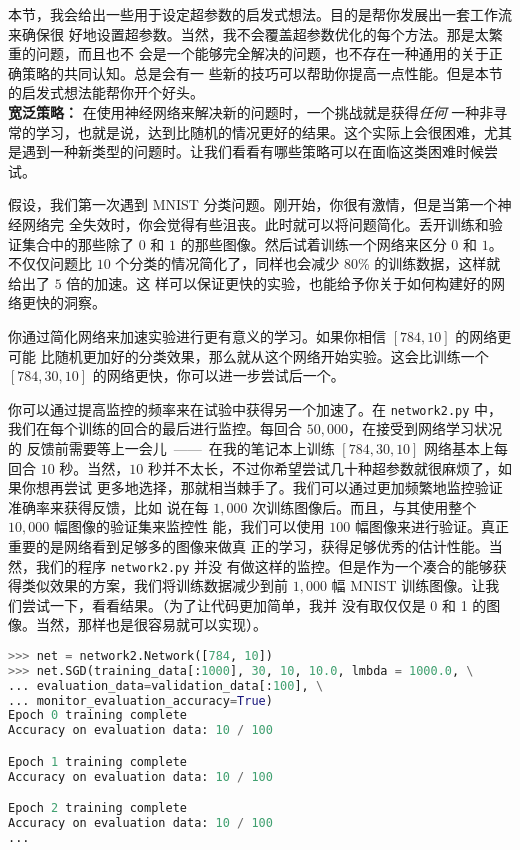 本节，我会给出一些用于设定超参数的启发式想法。目的是帮你发展出一套工作流来确保很
好地设置超参数。当然，我不会覆盖超参数优化的每个方法。那是太繁重的问题，而且也不
会是一个能够完全解决的问题，也不存在一种通用的关于正确策略的共同认知。总是会有一
些新的技巧可以帮助你提高一点性能。但是本节的启发式想法能帮你开个好头。\\

\textbf{宽泛策略：} 在使用神经网络来解决新的问题时，一个挑战就是获得\emph{任何}
一种非寻常的学习，也就是说，达到比随机的情况更好的结果。这个实际上会很困难，尤其
是遇到一种新类型的问题时。让我们看看有哪些策略可以在面临这类困难时候尝试。

假设，我们第一次遇到 MNIST 分类问题。刚开始，你很有激情，但是当第一个神经网络完
全失效时，你会觉得有些沮丧。此时就可以将问题简化。丢开训练和验证集合中的那些除了
$0$ 和 $1$ 的那些图像。然后试着训练一个网络来区分 $0$ 和 $1$。不仅仅问题比 $10$
个分类的情况简化了，同样也会减少 80\% 的训练数据，这样就给出了 $5$ 倍的加速。这
样可以保证更快的实验，也能给予你关于如何构建好的网络更快的洞察。

你通过简化网络来加速实验进行更有意义的学习。如果你相信 $[784, 10]$ 的网络更可能
比随机更加好的分类效果，那么就从这个网络开始实验。这会比训练一个 $[784, 30 ,10]$
的网络更快，你可以进一步尝试后一个。

你可以通过提高监控的频率来在试验中获得另一个加速了。在 \lstinline!network2.py!
中，我们在每个训练的回合的最后进行监控。每回合 $50,000$，在接受到网络学习状况的
反馈前需要等上一会儿~——~在我的笔记本上训练 $[784, 30, 10]$ 网络基本上每回合 $10$
秒。当然，$10$ 秒并不太长，不过你希望尝试几十种超参数就很麻烦了，如果你想再尝试
更多地选择，那就相当棘手了。我们可以通过更加频繁地监控验证准确率来获得反馈，比如
说在每 $1,000$ 次训练图像后。而且，与其使用整个 $10,000$ 幅图像的验证集来监控性
能，我们可以使用 $100$ 幅图像来进行验证。真正重要的是网络看到足够多的图像来做真
正的学习，获得足够优秀的估计性能。当然，我们的程序 \lstinline!network2.py! 并没
有做这样的监控。但是作为一个凑合的能够获得类似效果的方案，我们将训练数据减少到前
$1,000$ 幅 MNIST 训练图像。让我们尝试一下，看看结果。（为了让代码更加简单，我并
  没有取仅仅是 0 和 1 的图像。当然，那样也是很容易就可以实现）。
\begin{lstlisting}[language=Python]
>>> net = network2.Network([784, 10])
>>> net.SGD(training_data[:1000], 30, 10, 10.0, lmbda = 1000.0, \
... evaluation_data=validation_data[:100], \
... monitor_evaluation_accuracy=True)
Epoch 0 training complete
Accuracy on evaluation data: 10 / 100

Epoch 1 training complete
Accuracy on evaluation data: 10 / 100

Epoch 2 training complete
Accuracy on evaluation data: 10 / 100
...
\end{lstlisting}

